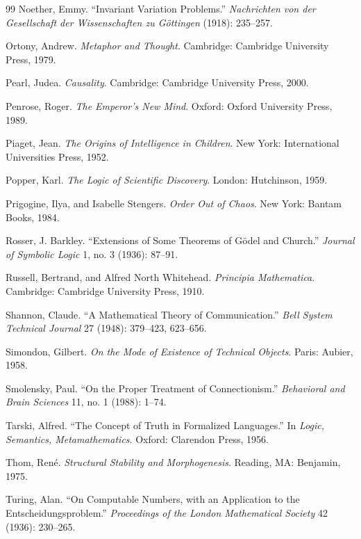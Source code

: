 \documentclass[12pt,openany]{book}
\theoremstyle{plain}
\theoremstyle{definition}
\theoremstyle{remark}
\begin{document}
\begin{thebibliography}{99}
Noether, Emmy.
``Invariant Variation Problems.''
\textit{Nachrichten von der Gesellschaft der Wissenschaften zu Göttingen} (1918): 235--257.

Ortony, Andrew.
\textit{Metaphor and Thought}.
Cambridge: Cambridge University Press, 1979.

Pearl, Judea.
\textit{Causality}.
Cambridge: Cambridge University Press, 2000.

Penrose, Roger.
\textit{The Emperor's New Mind}.
Oxford: Oxford University Press, 1989.

Piaget, Jean.
\textit{The Origins of Intelligence in Children}.
New York: International Universities Press, 1952.

Popper, Karl.
\textit{The Logic of Scientific Discovery}.
London: Hutchinson, 1959.

Prigogine, Ilya, and Isabelle Stengers.
\textit{Order Out of Chaos}.
New York: Bantam Books, 1984.

Rosser, J. Barkley.
``Extensions of Some Theorems of Gödel and Church.''
\textit{Journal of Symbolic Logic} 1, no. 3 (1936): 87--91.

Russell, Bertrand, and Alfred North Whitehead.
\textit{Principia Mathematica}.
Cambridge: Cambridge University Press, 1910.

Shannon, Claude.
``A Mathematical Theory of Communication.''
\textit{Bell System Technical Journal} 27 (1948): 379--423, 623--656.

Simondon, Gilbert.
\textit{On the Mode of Existence of Technical Objects}.
Paris: Aubier, 1958.

Smolensky, Paul.
``On the Proper Treatment of Connectionism.''
\textit{Behavioral and Brain Sciences} 11, no. 1 (1988): 1--74.

Tarski, Alfred.
``The Concept of Truth in Formalized Languages.''
In \textit{Logic, Semantics, Metamathematics}.
Oxford: Clarendon Press, 1956.

Thom, René.
\textit{Structural Stability and Morphogenesis}.
Reading, MA: Benjamin, 1975.

Turing, Alan.
``On Computable Numbers, with an Application to the Entscheidungsproblem.''
\textit{Proceedings of the London Mathematical Society} 42 (1936): 230--265.


\end{thebibliography}
\end{document}
